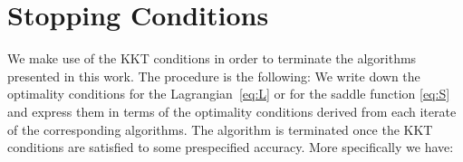 \documentclass[openany]{now}
\begin{document}
\chapter{Stopping Conditions}{\label{App::Stop_Crit}}
We make use of the KKT conditions in order to terminate the algorithms presented in this work. The procedure is the following: We write down the optimality conditions for the Lagrangian~\eqref{eq:L} or for the saddle function \eqref{eq:S} and express them in terms of the optimality conditions derived from each iterate of the corresponding algorithms. The algorithm is terminated once the KKT conditions are satisfied to some prespecified accuracy. More specifically we have:
\end{document}
